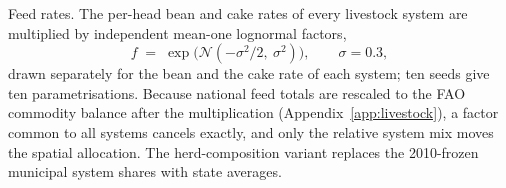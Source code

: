 Feed rates. The per-head bean and cake rates of every livestock system
are multiplied by independent mean-one lognormal factors,
\begin{equation}\label{eq:feedjitter}
  f \;=\; \exp\!\big(\mathcal{N}(-\sigma^2/2,\ \sigma^2)\big),
  \qquad \sigma = 0.3 ,
\end{equation}
drawn separately for the bean and the cake rate of each system; ten
seeds give ten parametrisations. Because national feed totals are
rescaled to the FAO commodity balance after the multiplication
(Appendix~\ref{app:livestock}), a factor common to all systems cancels
exactly, and only the relative system mix moves the spatial
allocation. The herd-composition variant replaces the 2010-frozen
municipal system shares with state averages.
